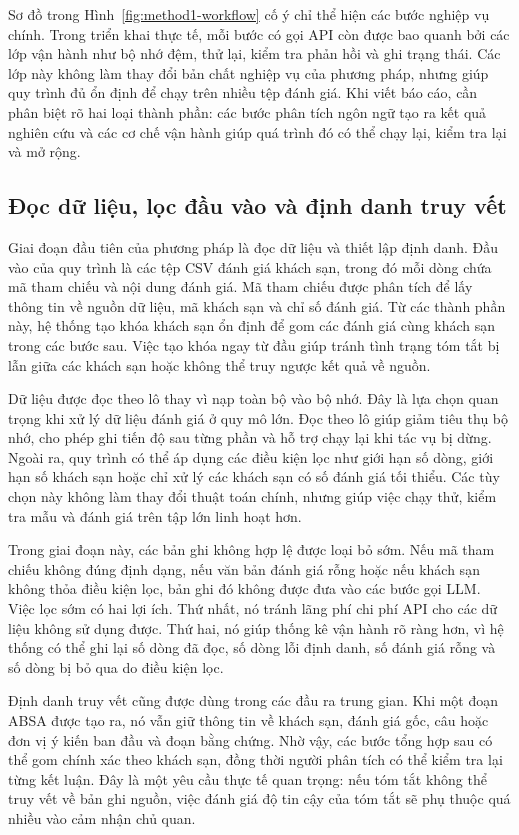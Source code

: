 \documentclass[12pt,a4paper]{report}
\begin{document}
Sơ đồ trong Hình~\ref{fig:method1-workflow} cố ý chỉ thể hiện các bước nghiệp vụ chính. Trong triển khai thực tế, mỗi bước có gọi API còn được bao quanh bởi các lớp vận hành như bộ nhớ đệm, thử lại, kiểm tra phản hồi và ghi trạng thái. Các lớp này không làm thay đổi bản chất nghiệp vụ của phương pháp, nhưng giúp quy trình đủ ổn định để chạy trên nhiều tệp đánh giá. Khi viết báo cáo, cần phân biệt rõ hai loại thành phần: các bước phân tích ngôn ngữ tạo ra kết quả nghiên cứu và các cơ chế vận hành giúp quá trình đó có thể chạy lại, kiểm tra lại và mở rộng.

\subsection{Đọc dữ liệu, lọc đầu vào và định danh truy vết}

Giai đoạn đầu tiên của phương pháp là đọc dữ liệu và thiết lập định danh. Đầu vào của quy trình là các tệp CSV đánh giá khách sạn, trong đó mỗi dòng chứa mã tham chiếu và nội dung đánh giá. Mã tham chiếu được phân tích để lấy thông tin về nguồn dữ liệu, mã khách sạn và chỉ số đánh giá. Từ các thành phần này, hệ thống tạo khóa khách sạn ổn định để gom các đánh giá cùng khách sạn trong các bước sau. Việc tạo khóa ngay từ đầu giúp tránh tình trạng tóm tắt bị lẫn giữa các khách sạn hoặc không thể truy ngược kết quả về nguồn.

Dữ liệu được đọc theo lô thay vì nạp toàn bộ vào bộ nhớ. Đây là lựa chọn quan trọng khi xử lý dữ liệu đánh giá ở quy mô lớn. Đọc theo lô giúp giảm tiêu thụ bộ nhớ, cho phép ghi tiến độ sau từng phần và hỗ trợ chạy lại khi tác vụ bị dừng. Ngoài ra, quy trình có thể áp dụng các điều kiện lọc như giới hạn số dòng, giới hạn số khách sạn hoặc chỉ xử lý các khách sạn có số đánh giá tối thiểu. Các tùy chọn này không làm thay đổi thuật toán chính, nhưng giúp việc chạy thử, kiểm tra mẫu và đánh giá trên tập lớn linh hoạt hơn.

Trong giai đoạn này, các bản ghi không hợp lệ được loại bỏ sớm. Nếu mã tham chiếu không đúng định dạng, nếu văn bản đánh giá rỗng hoặc nếu khách sạn không thỏa điều kiện lọc, bản ghi đó không được đưa vào các bước gọi LLM. Việc lọc sớm có hai lợi ích. Thứ nhất, nó tránh lãng phí chi phí API cho các dữ liệu không sử dụng được. Thứ hai, nó giúp thống kê vận hành rõ ràng hơn, vì hệ thống có thể ghi lại số dòng đã đọc, số dòng lỗi định danh, số đánh giá rỗng và số dòng bị bỏ qua do điều kiện lọc.

Định danh truy vết cũng được dùng trong các đầu ra trung gian. Khi một đoạn ABSA được tạo ra, nó vẫn giữ thông tin về khách sạn, đánh giá gốc, câu hoặc đơn vị ý kiến ban đầu và đoạn bằng chứng. Nhờ vậy, các bước tổng hợp sau có thể gom chính xác theo khách sạn, đồng thời người phân tích có thể kiểm tra lại từng kết luận. Đây là một yêu cầu thực tế quan trọng: nếu tóm tắt không thể truy vết về bản ghi nguồn, việc đánh giá độ tin cậy của tóm tắt sẽ phụ thuộc quá nhiều vào cảm nhận chủ quan.
\end{document}
